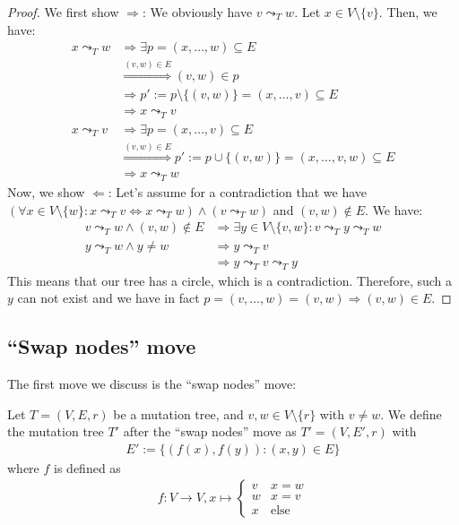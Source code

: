 \begin{proof}
    We first show $\Rightarrow$: We obviously have $v \leadsto_T w$. Let $x \in V \setminus \{v\}$. Then, we have:
    \begin{align*}
        x \leadsto_T w  &\Rightarrow \exists p = (x, \dots, w) \subseteq E \\
                        &\stackrel{(v, w) \in E}{\Rightarrow} (v, w) \in p \\
                        &\Rightarrow p' := p \setminus \{(v, w)\} = (x, \dots, v) \subseteq E \\
                        &\Rightarrow x \leadsto_T v \\
        x \leadsto_T v  &\Rightarrow \exists p = (x, \dots, v) \subseteq E \\
                        &\stackrel{(v, w) \in E}{\Rightarrow} p' := p \cup \{(v, w)\} = (x, \dots, v, w) \subseteq E \\
                        &\Rightarrow x \leadsto_T w
    \end{align*}
    Now, we show $\Leftarrow$: Let's assume for a contradiction that we have $(\forall x \in V \setminus \{w\}: x \leadsto_T v \Leftrightarrow x \leadsto_T w) \wedge (v \leadsto_T w)$ and $(v, w) \notin E$. We have:
    \begin{align*}
        v \leadsto_T w \wedge (v, w) \notin E &\Rightarrow \exists y \in V \setminus \{v, w\}: v \leadsto_T y \leadsto_T w \\
        y \leadsto_T w \wedge y \neq w &\Rightarrow y \leadsto_T v \\
        &\Rightarrow y \leadsto_T v \leadsto_T y
    \end{align*}
    This means that our tree has a circle, which is a contradiction. Therefore, such a $y$ can not exist and we have in fact $p = (v, \dots, w) = (v, w) \Rightarrow (v, w) \in E$.
\end{proof}

\subsection{``Swap nodes'' move}

The first move we discuss is the ``swap nodes'' move:

\begin{definition}
    \label{def:swap_nodes}
    Let $T = (V, E, r)$ be a mutation tree, and $v, w \in V \setminus \{r\}$ with $v \neq w$. We define the mutation tree $T'$ after the ``swap nodes'' move as $T' = (V, E', r)$ with
    \begin{align*}
        E' := \{(f(x), f(y)) : (x, y) \in E\}
    \end{align*}
    where $f$ is defined as
    \begin{align*}
        f: V \rightarrow V, x \mapsto \begin{cases}
            v & x = w \\
            w & x = v \\
            x & \text{else}
        \end{cases}
    \end{align*}
\end{definition}

